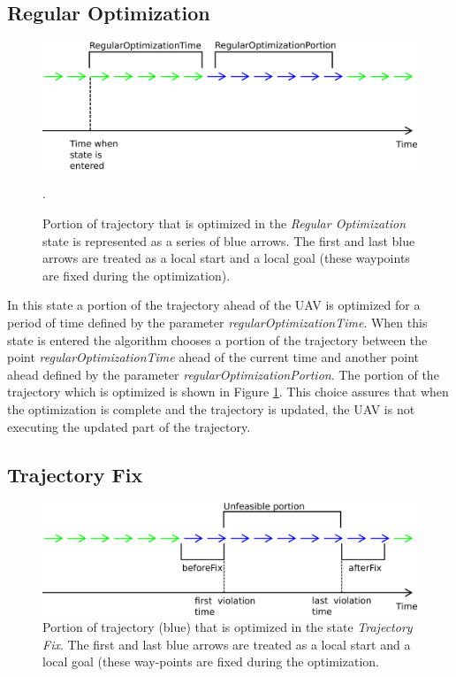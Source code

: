 \subsection{Regular Optimization}
\begin{figure}[!ht]
   \centering
   \includegraphics[width=0.9\linewidth]{Figures/06_software/regOptTime.png}
   \caption{Portion of trajectory that is optimized in the \textit{Regular Optimization} state is represented as a series of blue arrows. The first and last blue arrows are treated as a local start and a local goal (these waypoints are fixed during the optimization).}.
   \label{fig:regOptTime}
\end{figure}

In this state a portion of the trajectory ahead of the UAV is optimized for a period of time defined by the parameter \textit{regularOptimizationTime}. When this state is entered the algorithm chooses a portion of the trajectory between the point \textit{regularOptimizationTime} ahead of the current time and another point ahead defined by the parameter \textit{regularOptimizationPortion}. The portion of the trajectory which is optimized is shown in Figure \ref{fig:regOptTime}. This choice assures that when the optimization is complete and the trajectory is updated, the UAV is not executing the updated part of the trajectory.

\subsection{Trajectory Fix}
\begin{figure}[!ht]
   \centering
   \includegraphics[width=0.9\linewidth]{Figures/06_software/fixOptTime.png}
   \caption{Portion of trajectory (blue) that is optimized in the state \textit{Trajectory Fix}. The first and last blue arrows are treated as a local start and a local goal (these way-points are fixed during the optimization.}
   \label{fig:fixOptTime}
\end{figure}

